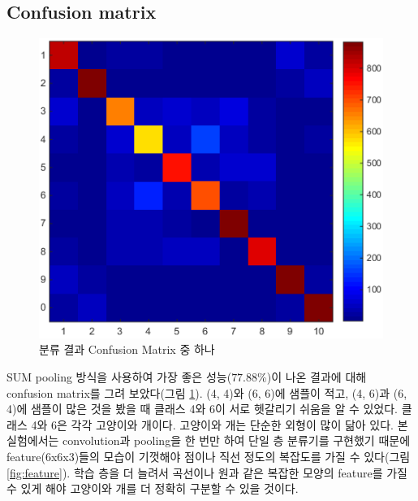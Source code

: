 \documentclass[a4paper,9pt,hidelinks]{article}
\begin{document}
\begin{multicols*}{2}
\subsection{Confusion matrix}

\begin{figure}[H]
\includegraphics[width=\linewidth]{confusion_matrix}
\caption{분류 결과 Confusion Matrix 중 하나}
\label{fig:confusion_matrix}
\end{figure}

SUM pooling 방식을 사용하여 가장 좋은 성능($77.88$\%)이 나온 결과에 대해 confusion matrix를 그려 보았다(그림 \ref{fig:confusion_matrix}).
(4, 4)와 (6, 6)에 샘플이 적고, (4, 6)과 (6, 4)에 샘플이 많은 것을 봤을 때 클래스 4와 6이 서로 헷갈리기 쉬움을 알 수 있었다.
클래스 4와 6은 각각 고양이와 개이다.
고양이와 개는 단순한 외형이 많이 닮아 있다.
본 실험에서는 convolution과 pooling을 한 번만 하여 단일 층 분류기를 구현했기 때문에 feature(6x6x3)들의 모습이 기껏해야 점이나 직선 정도의 복잡도를 가질 수 있다(그림 \ref{fig:feature}).
학습 층을 더 늘려서 곡선이나 원과 같은 복잡한 모양의 feature를 가질 수 있게 해야 고양이와 개를 더 정확히 구분할 수 있을 것이다.


\end{multicols*}
\end{document}
